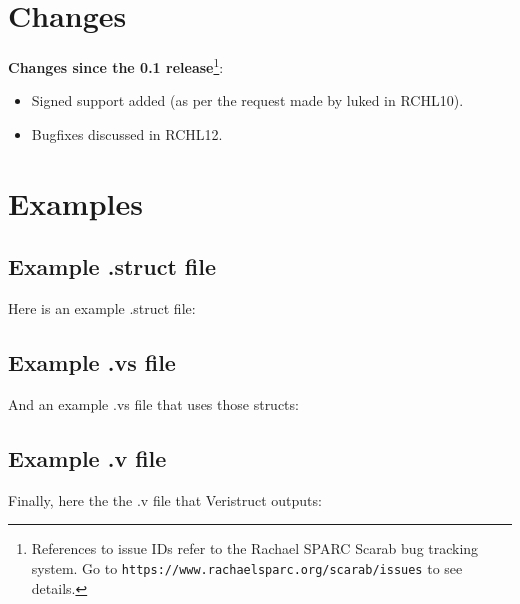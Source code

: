 \documentclass[a4paper]{article} \usepackage[dvips]{graphicx}
\begin{document}
\section{Changes}
\label{sec:changes}
\textbf{Changes since the 0.1 release}\footnote{References to issue
  IDs refer to the Rachael SPARC Scarab bug tracking system. Go to
  \texttt{https://www.rachaelsparc.org/scarab/issues} to see
  details.}:
\begin{itemize}
\item Signed support added (as per the request made by luked in
  RCHL10).
\item Bugfixes discussed in RCHL12.
\end{itemize}

\section{Examples}
\label{sec:examples}
\lstset{numbers=left, numberstyle=\tiny, stepnumber=1, numbersep=5pt,
  basicstyle=\ttfamily, keywordstyle=\ttfamily,
  identifierstyle=\ttfamily, commentstyle=\ttfamily,
  stringstyle=\ttfamily, breaklines}

\subsection{Example .struct file}
\label{sec:ex_struct_file}
Here is an example .struct file:



\subsection{Example .vs file}
\label{sec:ex_vs_file}
And an example .vs file that uses those structs:



\subsection{Example .v file}
\label{sec:ex_v_file}
Finally, here the the .v file that Veristruct outputs:


\end{document}
